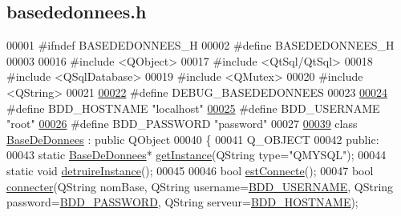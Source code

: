 \hypertarget{basededonnees_8h_source}{}\subsection{basededonnees.\+h}

\begin{DoxyCode}
00001 \textcolor{preprocessor}{#ifndef BASEDEDONNEES\_H}
00002 \textcolor{preprocessor}{#define BASEDEDONNEES\_H}
00003 
00016 \textcolor{preprocessor}{#include <QObject>}
00017 \textcolor{preprocessor}{#include <QtSql/QtSql>}
00018 \textcolor{preprocessor}{#include <QSqlDatabase>}
00019 \textcolor{preprocessor}{#include <QMutex>}
00020 \textcolor{preprocessor}{#include <QString>}
00021 
\hyperlink{basededonnees_8h_a9e9e0719c95bed0f3d5ae4cba0c9f5e4}{00022} \textcolor{preprocessor}{#define DEBUG\_BASEDEDONNEES}
00023 
\hyperlink{basededonnees_8h_af06096ec4ec654090fa78ab359d4a0dd}{00024} \textcolor{preprocessor}{#define BDD\_HOSTNAME        "localhost"}
\hyperlink{basededonnees_8h_a88b5f5b81fa534553c68802384beff2c}{00025} \textcolor{preprocessor}{#define BDD\_USERNAME        "root"}
\hyperlink{basededonnees_8h_ae2ded9166ed2553182545e97514c04f7}{00026} \textcolor{preprocessor}{#define BDD\_PASSWORD        "password"}
00027 
\hyperlink{class_base_de_donnees}{00039} \textcolor{keyword}{class }\hyperlink{class_base_de_donnees}{BaseDeDonnees} : \textcolor{keyword}{public} QObject
00040 \{
00041     Q\_OBJECT
00042     \textcolor{keyword}{public}:
00043         \textcolor{keyword}{static} \hyperlink{class_base_de_donnees}{BaseDeDonnees}* \hyperlink{class_base_de_donnees_a80028aa2b6b4fbf30fb2e36357b7d3d3}{getInstance}(QString type=\textcolor{stringliteral}{"QMYSQL"});
00044         \textcolor{keyword}{static} \textcolor{keywordtype}{void} \hyperlink{class_base_de_donnees_a457401c0816b888c77ce915997545f4e}{detruireInstance}();
00045 
00046         \textcolor{keywordtype}{bool} \hyperlink{class_base_de_donnees_a00388973f3ec42e5c8e76e7af7e124b2}{estConnecte}();
00047         \textcolor{keywordtype}{bool} \hyperlink{class_base_de_donnees_ab2e092285ccc0ee1cce61a1774218561}{connecter}(QString nomBase, QString username=\hyperlink{basededonnees_8h_a88b5f5b81fa534553c68802384beff2c}{BDD\_USERNAME}, QString 
      password=\hyperlink{basededonnees_8h_ae2ded9166ed2553182545e97514c04f7}{BDD\_PASSWORD}, QString serveur=\hyperlink{basededonnees_8h_af06096ec4ec654090fa78ab359d4a0dd}{BDD\_HOSTNAME});

\end{DoxyCode}
